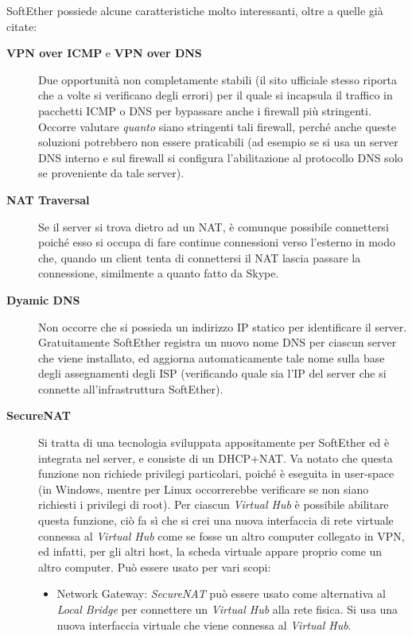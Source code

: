 SoftEther possiede alcune caratteristiche molto interessanti, oltre a quelle già citate:
\begin{description}
  \item[\textbf{VPN over ICMP} e \textbf{VPN over DNS}]Due opportunità non completamente stabili (il sito ufficiale stesso
  riporta che a volte si verificano degli errori) per il quale si incapsula il traffico in pacchetti ICMP
  o DNS per bypassare anche i firewall più stringenti. Occorre valutare \textit{quanto}
  siano stringenti tali firewall, perché anche queste soluzioni potrebbero non essere
  praticabili (ad esempio se si usa un server DNS interno e sul firewall si configura l'abilitazione
  al protocollo DNS solo se proveniente da tale server)\cite{softether-vpn-over-icmp}.
  \item[\textbf{NAT Traversal}]Se il server si trova dietro ad un NAT, è comunque possibile connettersi poiché
  esso si occupa di fare continue connessioni verso l'esterno in modo che, quando un client tenta di connettersi
  il NAT lascia passare la connessione, similmente a quanto fatto da Skype\cite{softether-dynamic-dns-nat-trav}.
  \item[\textbf{Dyamic DNS}]Non occorre che si possieda un indirizzo IP statico per identificare il server.
  Gratuitamente SoftEther registra un nuovo nome DNS per ciascun server che viene installato, ed aggiorna
  automaticamente tale nome sulla base degli assegnamenti degli ISP (verificando quale sia l'IP
  del server che si connette all'infrastruttura SoftEther).
  \item[\textbf{SecureNAT}]Si tratta di una tecnologia sviluppata appositamente per SoftEther ed è integrata
  nel server, e consiste di un DHCP+NAT. Va notato che questa funzione non richiede privilegi particolari,
  poiché è eseguita in user-space (in Windows, mentre per Linux occorrerebbe verificare se non siano
  richiesti i privilegi di root)\cite{softether-exploit-securenat}.
  Per ciascun \textit{Virtual Hub} è possibile abilitare questa funzione, ciò fa sì che si crei
  una nuova interfaccia di rete virtuale connessa al \textit{Virtual Hub}
  come se fosse un altro computer collegato in VPN, ed infatti, per gli altri host, la scheda virtuale appare proprio
  come un altro computer. Può essere usato per vari scopi:
  \begin{itemize}
    \item Network Gateway: \textit{SecureNAT} può essere usato come alternativa al \textit{Local Bridge} per
    connettere un \textit{Virtual Hub} alla rete fisica. Si usa una nuova interfaccia virtuale che viene connessa al \textit{Virtual Hub}.

\end{itemize}
\end{description}
